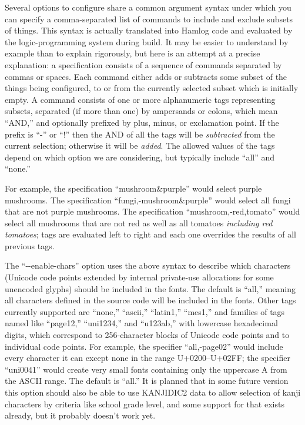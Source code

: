 \documentclass[14pt]{extarticle}
\begin{document}
Several options to configure share a common argument syntax under which you
can specify a comma-separated list of commands to include and exclude
subsets of things.  This syntax is actually translated into Hamlog code and
evaluated by the logic-programming system during build.  It may be easier
to understand by example than to explain rigorously, but here is an attempt
at a precise explanation: a specification consists of a sequence of commands
separated by commas or spaces.  Each command either adds or subtracts some
subset of the things being configured, to or from the currently selected
subset which is initially empty.  A command consists of one or more
alphanumeric tags representing subsets, separated (if more than one) by
ampersands or colons, which mean ``AND,'' and optionally prefixed by plus,
minus, or exclamation point.  If the prefix is ``-'' or ``!'' then the AND
of all the tags will be \emph{subtracted} from the current selection;
otherwise it will be \emph{added}.  The allowed values of the tags depend on
which option we are considering, but typically include ``all'' and ``none.''

For example, the specification ``mushroom\&purple'' would select purple
mushrooms.  The specification ``fungi,-mushroom\&purple'' would select all
fungi that are not purple mushrooms.  The specification
``mushroom,-red,tomato'' would select all mushrooms that are not red as well
as all tomatoes \emph{including red tomatoes}; tags are evaluated left to
right and each one overrides the results of all previous tags.

The ``-{}-enable-chars'' option uses the above syntax to describe which
characters (Unicode code points extended by internal private-use allocations
for some unencoded glyphs) should be included in the fonts.  The default is
``all,'' meaning all characters defined in the source code will be included
in the fonts.  Other tags currently supported are ``none,'' ``ascii,''
``latin1,'' ``mes1,'' and families of tags named like ``page12,''
``uni1234,'' and ``u123ab,'' with lowercase hexadecimal digits, which
correspond to 256-character blocks of Unicode code points and to individual
code points.  For example, the specifier ``all,-page02'' would include every
character it can except none in the range U+0200--U+02FF; the specifier
``uni0041'' would create very small fonts containing only the uppercase A
from the ASCII range.  The default is ``all.'' It is planned that in some
future version this option should also be able to use KANJIDIC2 data to
allow selection of kanji characters by criteria like school grade level, and
some support for that exists already, but it probably doesn't work yet.
\end{document}
